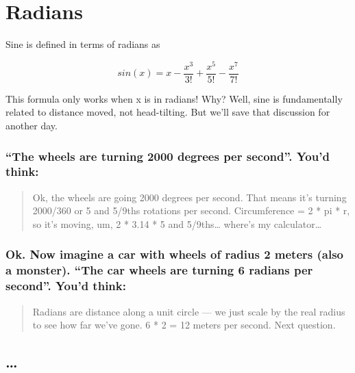 \documentclass[
  12pt,
]{article}
\author{}
\date{}
\begin{document}
\hypertarget{radians}{%
\section{Radians}\label{radians}}

Sine is defined in terms of radians as

\[
sin(x) = x - \frac{x^3}{3!} + \frac{x^5}{5!} - \frac{x^7}{7!}
\]

This formula only works when x is in radians! Why? Well, sine is
fundamentally related to distance moved, not head-tilting. But we'll
save that discussion for another day.

\hypertarget{the-wheels-are-turning-2000-degrees-per-second.-youd-think}{%
\subsubsection{``The wheels are turning 2000 degrees per second''. You'd
think:}\label{the-wheels-are-turning-2000-degrees-per-second.-youd-think}}

\begin{quote}
Ok, the wheels are going 2000 degrees per second. That means it's
turning 2000/360 or 5 and 5/9ths rotations per second. Circumference = 2
* pi * r, so it's moving, um, 2 * 3.14 * 5 and 5/9ths\ldots{} where's my
calculator\ldots{}
\end{quote}

\hypertarget{ok.-now-imagine-a-car-with-wheels-of-radius-2-meters-also-a-monster.-the-car-wheels-are-turning-6-radians-per-second.-youd-think}{%
\subsubsection{Ok. Now imagine a car with wheels of radius 2 meters
(also a monster). ``The car wheels are turning 6 radians per second''.
You'd
think:}\label{ok.-now-imagine-a-car-with-wheels-of-radius-2-meters-also-a-monster.-the-car-wheels-are-turning-6-radians-per-second.-youd-think}}

\begin{quote}
Radians are distance along a unit circle --- we just scale by the real
radius to see how far we've gone. 6 * 2 = 12 meters per second. Next
question.
\end{quote}

\hypertarget{section}{%
\subsection{\ldots{}}\label{section}}
\end{document}
